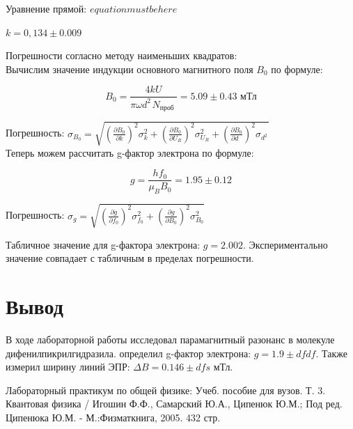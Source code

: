 \documentclass[14pt,a4paper]{scrartcl}
\begin{document}
Уравнение прямой: $equation must be here$

$k = 0,134 \pm 0.009$

Погрешности согласно методу наименьших квадратов:\\


Вычислим значение индукции основного магнитного поля $B_0$ по формуле:

$$
B_{0}=\frac{4 k U}{\pi \omega d_{\text { }}^{2} N_{\text {проб }}} = 5.09 \pm 0.43 \text{ мТл}
$$

Погрешность: $\sigma_{B_{0}}=\sqrt{\left(\frac{\partial B_{0}}{\partial k}\right)^{2} \sigma_{k}^{2}+\left(\frac{\partial B_{0}}{\partial U_{R}}\right)^{2} \sigma_{U_{R}}^{2}+\left(\frac{\partial B_{0}}{\partial d_{\text { }}}\right)^{2} \sigma_{d_{\text { }}^{2}}}$\\


Теперь можем рассчитать g-фактор электрона по формуле:

$$
g=\frac{h f_{0}}{\mu_{B} B_{0}} = 1.95 \pm 0.12 
$$

Погрешность: $\sigma_{g}=\sqrt{\left(\frac{\partial g}{\partial f_{0}}\right)^{2} \sigma_{f_{0}}^{2}+\left(\frac{\partial g}{\partial B_{0}}\right)^{2} \sigma_{B_{0}}^{2}}$

Табличное значение для g-фактора электрона: $g = 2.002$. Экспериментально значение совпадает с табличным в пределах погрешности.


\section{Вывод}

В ходе лабораторной работы исследовал парамагнитный разонанс в молекуле дифенилпикрилгидразила. определил g-фактор электрона: $g = 1.9 \pm dfdf$. Также измерил ширину линий ЭПР: $\Delta B = 0.146 \pm dfs \text{ мТл.}$





\newpage

\begin{thebibliography}{}

Лабораторный практикум по общей физике: Учеб. пособие для вузов. Т. 3. Квантовая физика / Игошин Ф.Ф., Самарский Ю.А., Ципенюк Ю.М.; Под ред. Ципенюка Ю.М. - М.:Физматкнига, 2005. 432 стр.



	
\end{thebibliography}
\end{document}
